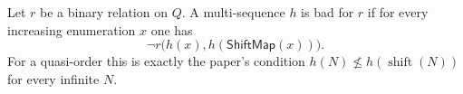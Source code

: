 \begin{definition}
Let $r$ be a binary relation on $Q$.  A multi-sequence $h$ is bad for $r$ if
for every increasing enumeration $x$ one has
\[
\neg r\bigl(h(x),h(\mathsf{ShiftMap}(x))\bigr).
\]
For a quasi-order this is exactly the paper's condition
$h(N)\nleq h(\operatorname{shift}(N))$ for every infinite $N$.
\end{definition}
